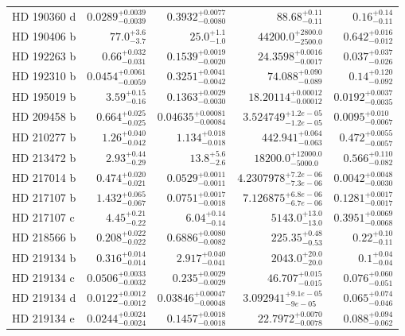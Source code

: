 \begin{longtable*}{lrrrr}
HD 190360 d & $0.0289^{+0.0039}_{-0.0039}$ & $0.3932^{+0.0077}_{-0.0080}$ & $88.68^{+0.11}_{-0.11}$ & $0.16^{+0.14}_{-0.11}$ \\ 
HD 190406 b & $77.0^{+3.6}_{-3.7}$ & $25.0^{+1.1}_{-1.0}$ & $44200.0^{+2800.0}_{-2500.0}$ & $0.642^{+0.016}_{-0.012}$ \\ 
HD 192263 b & $0.66^{+0.032}_{-0.031}$ & $0.1539^{+0.0019}_{-0.0020}$ & $24.3598^{+0.0016}_{-0.0017}$ & $0.037^{+0.037}_{-0.026}$ \\ 
HD 192310 b & $0.0454^{+0.0061}_{-0.0059}$ & $0.3251^{+0.0041}_{-0.0042}$ & $74.088^{+0.090}_{-0.089}$ & $0.14^{+0.120}_{-0.092}$ \\ 
HD 195019 b & $3.59^{+0.15}_{-0.16}$ & $0.1363^{+0.0029}_{-0.0030}$ & $18.20114^{+0.00012}_{-0.00012}$ & $0.0192^{+0.0037}_{-0.0035}$ \\ 
HD 209458 b & $0.664^{+0.025}_{-0.025}$ & $0.04635^{+0.00081}_{-0.00084}$ & $3.524749^{+1.2e-05}_{-1.2e-05}$ & $0.0095^{+0.010}_{-0.0067}$ \\ 
HD 210277 b & $1.26^{+0.040}_{-0.042}$ & $1.134^{+0.018}_{-0.018}$ & $442.941^{+0.064}_{-0.063}$ & $0.472^{+0.0055}_{-0.0057}$ \\ 
HD 213472 b & $2.93^{+0.44}_{-0.29}$ & $13.8^{+5.6}_{-2.6}$ & $18200.0^{+12000.0}_{-5000.0}$ & $0.566^{+0.110}_{-0.082}$ \\ 
HD 217014 b & $0.474^{+0.020}_{-0.021}$ & $0.0529^{+0.0011}_{-0.0011}$ & $4.2307978^{+7.2e-06}_{-7.3e-06}$ & $0.0042^{+0.0048}_{-0.0030}$ \\ 
HD 217107 b & $1.432^{+0.065}_{-0.067}$ & $0.0751^{+0.0017}_{-0.0018}$ & $7.126875^{+6.8e-06}_{-6.7e-06}$ & $0.1281^{+0.0017}_{-0.0017}$ \\ 
HD 217107 c & $4.45^{+0.21}_{-0.22}$ & $6.04^{+0.14}_{-0.14}$ & $5143.0^{+13.0}_{-13.0}$ & $0.3951^{+0.0069}_{-0.0068}$ \\ 
HD 218566 b & $0.208^{+0.022}_{-0.022}$ & $0.6886^{+0.0080}_{-0.0082}$ & $225.35^{+0.48}_{-0.53}$ & $0.22^{+0.10}_{-0.11}$ \\ 
HD 219134 b & $0.316^{+0.014}_{-0.014}$ & $2.917^{+0.040}_{-0.041}$ & $2043.0^{+20.0}_{-20.0}$ & $0.1^{+0.04}_{-0.04}$ \\ 
HD 219134 c & $0.0506^{+0.0033}_{-0.0032}$ & $0.235^{+0.0029}_{-0.0029}$ & $46.707^{+0.015}_{-0.015}$ & $0.076^{+0.060}_{-0.051}$ \\ 
HD 219134 d & $0.0122^{+0.0012}_{-0.0012}$ & $0.03846^{+0.00047}_{-0.00048}$ & $3.092941^{+9.1e-05}_{-9e-05}$ & $0.065^{+0.074}_{-0.046}$ \\ 
HD 219134 e & $0.0244^{+0.0024}_{-0.0024}$ & $0.1457^{+0.0018}_{-0.0018}$ & $22.7972^{+0.0070}_{-0.0078}$ & $0.088^{+0.094}_{-0.062}$ \\ 

\end{longtable*}
